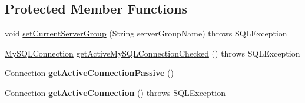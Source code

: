\subsection*{Protected Member Functions}
\begin{DoxyCompactItemize}
\item 
void \mbox{\hyperlink{classcom_1_1mysql_1_1fabric_1_1jdbc_1_1_fabric_my_s_q_l_connection_proxy_af555e33c27a54d2dbdc7e109f2b3c3a2}{set\+Current\+Server\+Group}} (String server\+Group\+Name)  throws S\+Q\+L\+Exception 
\item 
\mbox{\hyperlink{interfacecom_1_1mysql_1_1jdbc_1_1_my_s_q_l_connection}{My\+S\+Q\+L\+Connection}} \mbox{\hyperlink{classcom_1_1mysql_1_1fabric_1_1jdbc_1_1_fabric_my_s_q_l_connection_proxy_a9213b1ebeeb86a6ff86d758d60dc3dc9}{get\+Active\+My\+S\+Q\+L\+Connection\+Checked}} ()  throws S\+Q\+L\+Exception 
\item 
\mbox{\label{classcom_1_1mysql_1_1fabric_1_1jdbc_1_1_fabric_my_s_q_l_connection_proxy_ac81e97737f9af98262b98e5898ee2abd}} 
\mbox{\hyperlink{interfacecom_1_1mysql_1_1jdbc_1_1_connection}{Connection}} {\bfseries get\+Active\+Connection\+Passive} ()
\item 
\mbox{\label{classcom_1_1mysql_1_1fabric_1_1jdbc_1_1_fabric_my_s_q_l_connection_proxy_a0e2513c6cd55d669535f787fb80077c1}} 
\mbox{\hyperlink{interfacecom_1_1mysql_1_1jdbc_1_1_connection}{Connection}} {\bfseries get\+Active\+Connection} ()  throws S\+Q\+L\+Exception 
\end{DoxyCompactItemize}
